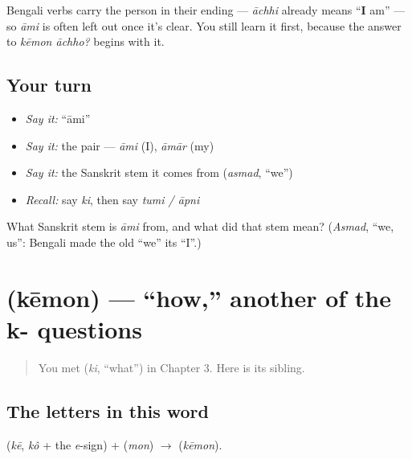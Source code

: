 \begin{grammarlens}[title={Grammar Lens: \textquotedblleft{}I\textquotedblright{} can often be dropped}]
Bengali verbs carry the person in their ending — \emph{āchhi} already means \textquotedblleft{}\textbf{I} am\textquotedblright{} — so \emph{āmi} is often left out once it's clear. You still learn it first, because the answer to \emph{kēmon āchho?} begins with it.
\end{grammarlens}

\subsection*{Your turn}
\begin{itemize}
\raggedright
  \item \emph{Say it:} \textquotedblleft{}āmi\textquotedblright{}
  \item \emph{Say it:} the pair — \emph{āmi} (I), \emph{āmār} (my)
  \item \emph{Say it:} the Sanskrit stem it comes from (\emph{asmad}, \textquotedblleft{}we\textquotedblright{})
  \item \emph{Recall:} say \emph{ki}, then say \emph{tumi / āpni}
\end{itemize}

\begin{tcolorbox}[breakable,colback=teal!4,colframe=teal!35!black,title={Before you move on}]
What Sanskrit stem is \emph{āmi} from, and what did that stem mean? (\emph{Asmad}, \textquotedblleft{}we, us\textquotedblright{}: Bengali made the old \textquotedblleft{}we\textquotedblright{} its \textquotedblleft{}I\textquotedblright{}.)
\end{tcolorbox}
\section[\texorpdfstring{\bn{কেমন} (kēmon)}{কেমন (kēmon)}]{ (kēmon) — \textquotedblleft{}how,\textquotedblright{} another of the k- questions}

\label{lesson:BN-C03-kemon}



\begin{quote}
You met \textbf{} (\emph{ki}, \textquotedblleft{}what\textquotedblright{}) in Chapter 3. Here is its sibling.
\end{quote}

\subsection*{The letters in this word}
\textbf{} (\emph{kē}, \emph{kô} + the \emph{e}-sign) + \textbf{} (\emph{mon}) $\to$ \textbf{} (\emph{kēmon}).

